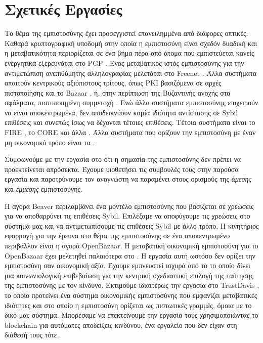 \section{Σχετικές Εργασίες}
  Το θέμα της εμπιστοσύνης έχει προσεγγιστεί επανειλημμένα από διάφορες οπτικές: Καθαρά κρυπτογραφική υποδομή στην οποία η
  εμπιστοσύνη είναι σχεδόν δυαδική και η μεταβατικότητα περιορίζεται σε ένα βήμα πέρα από άτομα που εμπιστεύεται κανείς
  ενεργητικά εξερευνάται στο \textlatin{PGP} \cite{pgp}. Ένας μεταβατικός ιστός εμπιστοσύνης για την αντιμετώπιση ανεπιθύμητης
  αλληλογραφίας μελετάται στο \textlatin{Freenet} \cite{freenet}. Άλλα συστήματα απαιτούν κεντρικούς αξιόπιστους τρίτους, όπως
  \textlatin{PKI} βασιζόμενα σε αρχές πιστοποίησης \cite{pki} και το \textlatin{Bazaar} \cite{bazaar}, ή, στην περίπτωση της
  Βυζαντινής ανοχής στα σφάλματα, πιστοποιημένη συμμετοχή \cite{byzantine}. Ενώ άλλα συστήματα εμπιστοσύνης επιχειρούν να
  είναι αποκεντρωμένα, δεν αποδεικνύουν καμία ιδιότητα αντίστασης σε \textlatin{Sybil} επιθέσεις και συνεπώς ίσως να δέχονται
  τέτοιες επιθέσεις. Τέτοια συστήματα είναι το \textlatin{FIRE} \cite{fire}, το \textlatin{CORE} \cite{core} και άλλα
  \cite{openrep,ghkkw,rk}. Άλλα συστήματα που ορίζουν την εμπιστοσύνη με έναν μη οικονομικό τρόπο είναι τα
  \cite{mui,beta,pace,vpc,sdt,wot,pathfinder}.

  Συμφωνούμε με την εργασία \cite{badtrust} στο ότι η σημασία της εμπιστοσύνης δεν πρέπει να προεκτείνεται απρόσεκτα. Έχουμε
  υιοθετήσει τις συμβουλές τους στην παρούσα εργασία και παροτρύνουμε τον αναγνώστη να παραμένει στους ορισμούς της
  \textit{άμεσης} και \textit{έμμεσης} εμπιστοσύνης.

  Η αγορά \textlatin{Beaver} \cite{beaver} περιλαμβάνει ένα μοντέλο εμπιστοσύνης που βασίζεται σε χρεώσεις για να αποθαρρύνει
  τις επιθέσεις \textlatin{Sybil}. Επιλέξαμε να αποφύγουμε τις χρεώσεις στο σύστημά μας και να αντιμετωπίσουμε τις επιθέσεις
  \textlatin{Sybil} με άλλο τρόπο. Η κινητήριος εφαρμογή για την έρευνα στο θέμα της εμπιστοσύνης σε ένα αποκεντρωμένο
  περιβάλλον είναι η αγορά \textlatin{OpenBazaar}. Η μεταβατική οικονομική εμπιστοσύνη για το \textlatin{OpenBazaar} έχει
  μελετηθεί παλαιότερα στο \cite{dionyziz}. Η εργασία αυτή ωστόσο δεν ορίζει την εμπιστοσύνη σαν οικονομική αξία. Έχουμε
  εμπνευστεί ισχυρά από το \cite{kmrs} το οποίο δίνει μια κοινωνιολογική επιβεβαίωση για την κεντρική σχεδιαστική επιλογή της
  ταύτησης της εμπιστοσύνης με τον κίνδυνο. Εκτιμούμε ιδιαιτέρως την εργασία στο \textlatin{TrustDavis} \cite{davis}, το οποίο
  προτείνει ένα σύστημα οικονομικής εμπιστοσύνης που εμφανίζει μεταβατικές ιδιότητες και στο οποίο η εμπιστοσύνη ορίζεται ως
  πιστωτικές γραμμές, όμοια με το δικό μας σύστημα. Μπορέσαμε να επεκτείνουμε την εργασία τους χρησιμοποιώντας το
  \textlatin{blockchain} για αυτόματες αποδείξεις κινδύνου, ένα εργαλείο που δεν είχαν στη διάθεσή τους τότε.

